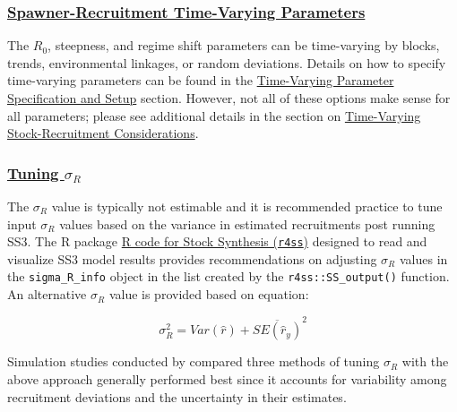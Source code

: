 \hypertarget{SRR-TV}{}
\subsubsection[Spawner-Recruitment Time-Varying Parameters]{\protect\hyperlink{SRR-TV}{Spawner-Recruitment Time-Varying Parameters}}

The $R_{0}$, steepness, and regime shift parameters can be time-varying by blocks, trends, environmental linkages, or random deviations. Details on how to specify time-varying parameters can be found in the \hyperlink{tvOrder}{Time-Varying Parameter Specification and Setup} section. However, not all of these options make sense for all parameters; please see additional details in the section on \hyperlink{tv-sr}{Time-Varying Stock-Recruitment Considerations}.

\hypertarget{TuneSigmaR}{}
\subsubsection[Tuning $\sigma_R$]{\protect\hyperlink{TuneSigmaR}{Tuning $\sigma_R$}}
The $\sigma_R$ value is typically not estimable and it is recommended practice to tune input $\sigma_R$ values based on the variance in estimated recruitments post running SS3. The R package \href{https://github.com/r4ss/r4ss}{R code for Stock Synthesis (\texttt{r4ss})} designed to read and visualize SS3 model results provides recommendations on adjusting $\sigma_R$ values in the \texttt{sigma\_R\_info} object in the list created by the \texttt{r4ss::SS\_output()} function. An alternative $\sigma_R$ value is provided based on equation:

\begin{equation}
	\sigma_R^2 = Var(\hat{r}) + \overline{SE(\hat{r}_y)}^2
\end{equation}

Simulation studies conducted by \citet{methot-adjusting-2011} compared three methods of tuning $\sigma_R$ with the above approach generally performed best since it accounts for variability among recruitment deviations and the uncertainty in their estimates.

\hypertarget{RecDevSetup}{}
